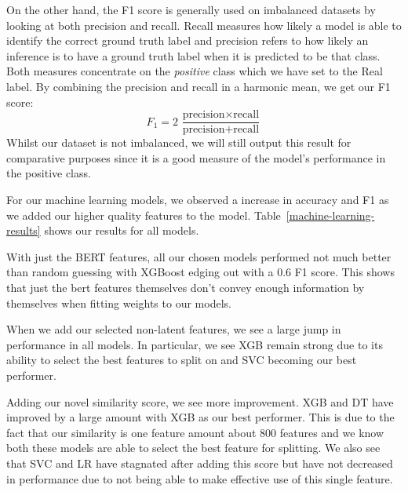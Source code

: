 \documentclass{article}
\begin{document}
On the other hand, the F1 score is generally used on imbalanced datasets by looking at both precision and recall. Recall measures how likely a model is able to identify the correct ground truth label and precision refers to how likely an inference is to have a ground truth label when it is predicted to be that class. Both measures concentrate on the \emph{positive} class which we have set to the Real label. By combining the precision and recall in a harmonic mean, we get our F1 score:
$$F_1 = 2\,\frac{\text{precision}\times\text{recall}}{\text{precision}+\text{recall}}$$
Whilst our dataset is not imbalanced, we will still output this result for comparative purposes since it is a good measure of the model's performance in the positive class.




For our machine learning models, we observed a increase in accuracy and F1 as we added our higher quality features to the model. Table~\ref{machine-learning-results} shows our results for all models.

With just the BERT features, all our chosen models performed not much better than random guessing with XGBoost edging out with a 0.6 F1 score. This shows that just the bert features themselves don't convey enough information by themselves when fitting weights to our models.

When we add our selected non-latent features, we see a large jump in performance in all models. In particular, we see XGB remain strong due to its ability to select the best features to split on and SVC becoming our best performer.

Adding our novel similarity score, we see more improvement. XGB and DT have improved by a large amount with XGB as our best performer. This is due to the fact that our similarity is one feature amount about 800 features and we know both these models are able to select the best feature for splitting. We also see that SVC and LR have stagnated after adding this score but have not decreased in performance due to not being able to make effective use of this single feature.
\end{document}
